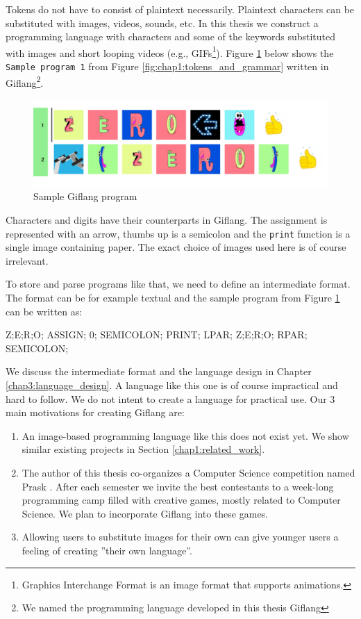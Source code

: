 Tokens do not have to consist of plaintext necessarily. Plaintext characters can be substituted with
images, videos, sounds, etc. In this thesis we construct a programming language with characters and some
of the keywords substituted with images and short looping videos (e.g., GIFs\footnote{Graphics Interchange Format is an image format that supports animations.}).
Figure \ref{fig:chap1:giflang_code} below shows the \texttt{Sample program 1} from Figure \ref{fig:chap1:tokens_and_grammar} written in
Giflang\footnote{We named the programming language developed in this thesis Giflang}.
\begin{figure}[!hbt]
	\includegraphics[width=\textwidth]{../img/giflang_code}
	\caption{Sample Giflang program}
	\label{fig:chap1:giflang_code}
\end{figure}

Characters and digits have their counterparts in Giflang. The assignment is represented with an arrow,
thumbs up is a semicolon and the \texttt{print} function is a single image containing paper. The exact choice of images used here is of course
irrelevant.

To store and parse programs like that, we need to define an intermediate format. The format can be for example
textual and the sample program from Figure \ref{fig:chap1:giflang_code} can be written as:
\begin{code}
Z;E;R;O; ASSIGN; 0; SEMICOLON;
PRINT; LPAR; Z;E;R;O; RPAR; SEMICOLON;
\end{code}

We discuss the intermediate format and the language design in Chapter \ref{chap3:language_design}. A language like this one is of
course impractical and hard to follow. We do not intent to create a language for practical use. Our $3$ main motivations for
creating Giflang are:
\begin{enumerate}
\item An image-based programming language like this does not exist yet. We show similar existing projects in Section \ref{chap1:related_work}. 
\item The author of this thesis co-organizes a Computer Science competition named Prask \cite{Prask}. After each semester we invite the best
contestants to a week-long programming camp filled with creative games, mostly related to Computer Science. We plan to incorporate Giflang into these games.
\item Allowing users to substitute images for their own can give younger users a feeling of creating ''their own language''.
\end{enumerate}

